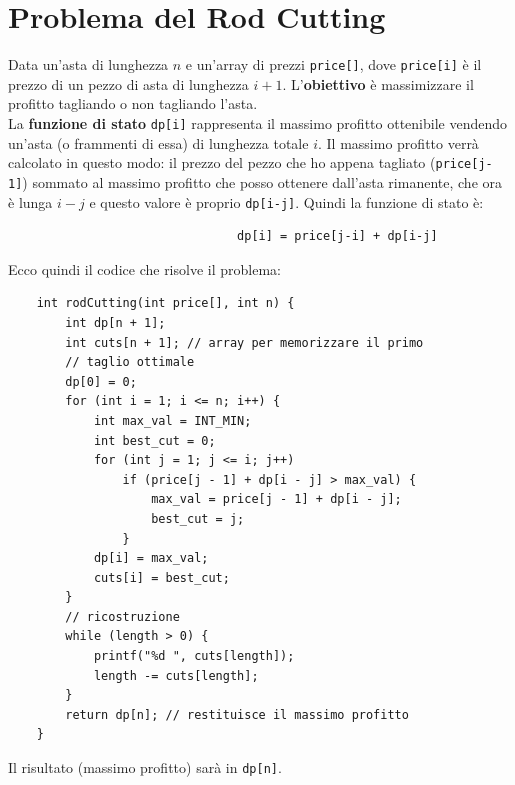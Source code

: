 \section{Problema del Rod Cutting}
Data un'asta di lunghezza $n$ e un'array di prezzi \texttt{price[]}, dove \texttt{price[i]} è il prezzo di un pezzo di asta di lunghezza $i+1$. L'\textbf{obiettivo}
è massimizzare il profitto tagliando o non tagliando l'asta.\smallskip\\
La \textbf{funzione di stato} \texttt{dp[i]} rappresenta il massimo profitto ottenibile vendendo un'asta (o frammenti di essa) di lunghezza totale $i$.
Il massimo profitto verrà calcolato in questo modo: il prezzo del pezzo che ho appena tagliato (\texttt{price[j-1]}) sommato al massimo profitto che posso
ottenere dall'asta rimanente, che ora è lunga $i-j$ e questo valore è proprio \texttt{dp[i-j]}. Quindi la funzione di stato è:\
\begin{verbatim}
                                dp[i] = price[j-i] + dp[i-j]
\end{verbatim} 
Ecco quindi il codice che risolve il problema:
\begin{verbatim}
    int rodCutting(int price[], int n) {
        int dp[n + 1];
        int cuts[n + 1]; // array per memorizzare il primo
        // taglio ottimale
        dp[0] = 0;
        for (int i = 1; i <= n; i++) {
            int max_val = INT_MIN;
            int best_cut = 0;
            for (int j = 1; j <= i; j++)
                if (price[j - 1] + dp[i - j] > max_val) {
                    max_val = price[j - 1] + dp[i - j];
                    best_cut = j;
                }
            dp[i] = max_val;
            cuts[i] = best_cut;
        }
        // ricostruzione
        while (length > 0) {
            printf("%d ", cuts[length]);
            length -= cuts[length];
        }
        return dp[n]; // restituisce il massimo profitto
    }
\end{verbatim}
Il risultato (massimo profitto) sarà in \texttt{dp[n]}.



